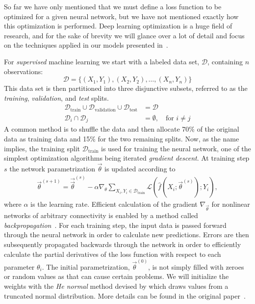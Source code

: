 So far we have only mentioned that we must define a loss function to be optimized for a given neural network, but we have not mentioned exactly how this optimization is performed.
Deep learning optimization is a huge field of research, and for the sake of brevity we will glance over a lot of detail and focus on the techniques applied in our models presented in~.

For \textit{supervised} machine learning we start with a labeled data set, $\mathcal{D}$, containing $n$ observations:
%
\begin{equation*}
  \mathcal{D} = \{(X_1, Y_1), (X_2, Y_2), \ldots, (X_n, Y_n)\}
\end{equation*}
%
This data set is then partitioned into three disjunctive subsets, referred to as the \textit{training}, \textit{validation}, and \textit{test} splits.
%
\begin{align*}
  \mathcal{D}_{\mathrm{train}} \cup \mathcal{D}_{\mathrm{validation}} \cup \mathcal{D}_{\mathrm{test}} &= \mathcal{D}\\
  \mathcal{D}_i \cap \mathcal{D}_j &= \emptyset,~~~\text{ for } i \neq j
\end{align*}
%
A common method is to shuffle the data and then allocate 70\% of the original data as training data and 15\% for the two remaining splits.
Now, as the name implies, the training split $\mathcal{D}_{\mathrm{train}}$ is used for training the neural network, one of the simplest optimization algorithms being iterated \textit{gradient descent}.
At training step $s$ the network parametrization $\vec{\theta}$ is updated according to
%
\begin{align*}
  \vec{\theta}^{(s + 1)}
  =
    \vec{\vec{\theta}}^{(s)}
    -
    \alpha \nabla_{\theta}
      \sum_{X_i, Y_i \in \mathcal{D}_{\mathrm{train}}}
      \mathcal{L}(\hat{f}(X_i; \vec{\theta}^{(s)}); Y_i)
  ,
\end{align*}
%
where $\alpha$ is the learning rate.
Efficient calculation of the gradient $\nabla_{\vec{\theta}}$ for nonlinear networks of arbitrary connectivity is enabled by a method called \textit{backpropagation}~\cite{backpropagation}.
For each training step, the input data is passed forward through the neural network in order to calculate new predictions.
Errors are then subsequently propagated backwards through the network in order to efficiently calculate the partial derivatives of the loss function with respect to each parameter $\theta_i$.
The initial parametrization, $\vec{\theta}^{(0)}$, is not simply filled with zeroes or random values as that can cause certain problems.
We will initialize the weights with the \textit{He normal} method devised by \citeauthor{he-normal} which draws values from a truncated normal distribution.
More details can be found in the original paper~\cite{he-normal}.

